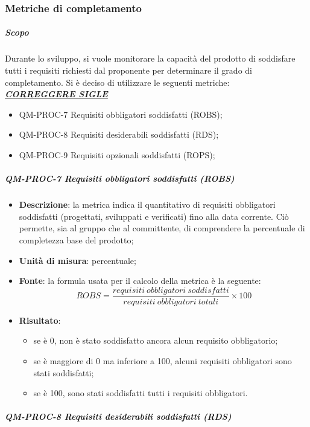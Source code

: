 		\subsubsection{Metriche di completamento}
			\subparagraph{Scopo}
			Durante lo sviluppo, si vuole monitorare la capacità del prodotto di soddisfare tutti i requisiti richiesti dal proponente per determinare il grado di completamento.
			Si è deciso di utilizzare le seguenti metriche:
			\\
			\textit{\underline{\textbf{CORREGGERE SIGLE}}}
			\begin{itemize}
				\item QM-PROC-7 Requisiti obbligatori soddisfatti (ROBS);
				\item QM-PROC-8 Requisiti desiderabili soddisfatti (RDS);
				\item QM-PROC-9 Requisiti opzionali soddisfatti (ROPS);
			\end{itemize}
			\subparagraph{QM-PROC-7 Requisiti obbligatori soddisfatti (ROBS)}
			\begin{itemize}
				\item \textbf{Descrizione}: la metrica indica il quantitativo di requisiti obbligatori soddisfatti (progettati, sviluppati e verificati) fino alla data corrente. Ciò permette, sia al gruppo che al committente, di comprendere la percentuale di completezza base del prodotto;
				\item \textbf{Unità di misura}: percentuale;
				\item \textbf{Fonte}: la formula usata per il calcolo della metrica è la seguente:
				\[
				ROBS = \frac{requisiti\ obbligatori\ soddisfatti}{requisiti\ obbligatori\ totali} \times 100
				\]
				\item \textbf{Risultato}:
				\begin{itemize}
					\item se è 0, non è stato soddisfatto ancora alcun requisito obbligatorio;
					\item se è maggiore di 0 ma inferiore a 100, alcuni requisiti obbligatori sono stati soddisfatti;
					\item se è 100, sono stati soddisfatti tutti i requisiti obbligatori.
				\end{itemize}
			\end{itemize}
			\subparagraph{QM-PROC-8 Requisiti desiderabili soddisfatti (RDS)}
